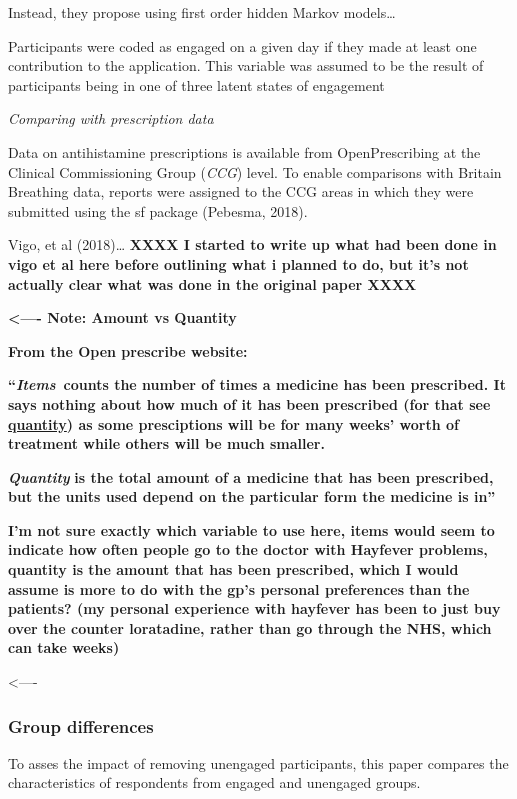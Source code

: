 \documentclass[
]{article}
\begin{document}
Instead, they propose using first order hidden Markov models\ldots{}

Participants were coded as engaged on a given day if they made at least
one contribution to the application. This variable was assumed to be the
result of participants being in one of three latent states of engagement

\emph{Comparing with prescription data}

Data on antihistamine prescriptions is available from OpenPrescribing at
the Clinical Commissioning Group (\emph{CCG}) level. To enable
comparisons with Britain Breathing data, reports were assigned to the
CCG areas in which they were submitted using the sf package (Pebesma,
2018).

Vigo, et al (2018)\ldots{} \textbf{XXXX I started to write up what had
been done in vigo et al here before outlining what i planned to do, but
it's not actually clear what was done in the original paper XXXX}

\textbf{\textless---- Note: Amount vs Quantity}

\textbf{From the Open prescribe website:}

\textbf{``\emph{Items}~counts the number of times a medicine has been
prescribed. It says nothing about how much of it has been prescribed
(for that see
\href{https://openprescribing.net/faq/\#prescquantity}{quantity}) as
some presciptions will be for many weeks' worth of treatment while
others will be much smaller.}

\textbf{\emph{Quantity}} \textbf{is the total amount of a medicine that
has been prescribed, but the units used depend on the particular form
the medicine is in''}

\textbf{I'm not sure exactly which variable to use here, items would
seem to indicate how often people go to the doctor with Hayfever
problems, quantity is the amount that has been prescribed, which I would
assume is more to do with the gp's personal preferences than the
patients? (my personal experience with hayfever has been to just buy
over the counter loratadine, rather than go through the NHS, which can
take weeks)}

\hfill\break
\textless----

\hypertarget{group-differences}{%
\subsubsection{Group differences}\label{group-differences}}

To asses the impact of removing unengaged participants, this paper
compares the characteristics of respondents from engaged and unengaged
groups.
\end{document}
